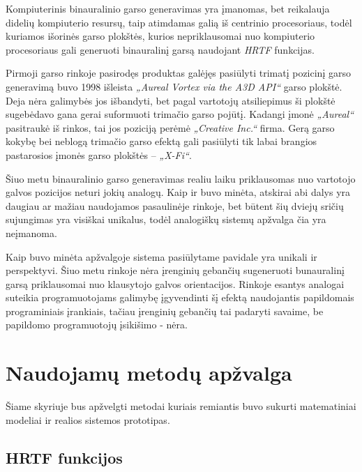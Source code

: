 \documentclass[]{vgtuef}
\begin{document}
Kompiuterinis binauralinio garso generavimas yra įmanomas, bet reikalauja didelių kompiuterio resursų, taip atimdamas galią iš centrinio procesoriaus, todėl kuriamos išorinės garso plokštės, kurios nepriklausomai nuo kompiuterio procesoriaus gali generuoti binauralinį garsą naudojant \textit{HRTF} funkcijas.

Pirmoji garso rinkoje pasirodęs produktas galėjęs pasiūlyti trimatį pozicinį garso generavimą buvo 1998 išleista \textit{„Aureal Vortex via the A3D API“} garso plokštė. Deja nėra  galimybės jos išbandyti, bet pagal vartotojų atsiliepimus ši plokštė sugebėdavo gana gerai suformuoti trimačio garso pojūtį. Kadangi įmonė \textit{„Aureal“} pasitraukė iš rinkos, tai jos poziciją perėmė \textit{„Creative Inc.“} firma. Gerą garso kokybę bei neblogą trimačio garso efektą gali pasiūlyti tik labai brangios pastarosios įmonės garso plokštės – \textit{„X-Fi“}. 

Šiuo metu binauralinio garso generavimas realiu laiku priklausomas nuo vartotojo galvos pozicijos neturi jokių analogų. Kaip ir buvo minėta, atskirai abi dalys yra daugiau ar mažiau naudojamos pasaulinėje rinkoje, bet būtent šių dviejų sričių sujungimas yra visiškai unikalus, todėl analogiškų sistemų apžvalga čia yra neįmanoma.

Kaip buvo minėta apžvalgoje sistema pasiūlytame pavidale yra unikali ir perspektyvi. Šiuo metu rinkoje nėra įrenginių gebančių sugeneruoti bunauralinį garsą priklausomai nuo klausytojo galvos orientacijos. Rinkoje esantys analogai suteikia programuotojams galimybę įgyvendinti šį efektą naudojantis papildomais programiniais įrankiais, tačiau įrenginių gebančių tai padaryti savaime, be papildomo programuotojų įsikišimo - nėra.

\section{Naudojamų metodų apžvalga}

Šiame skyriuje bus apžvelgti metodai kuriais remiantis buvo sukurti matematiniai modeliai ir realios sistemos prototipas.

\subsection{HRTF funkcijos}
\end{document}
